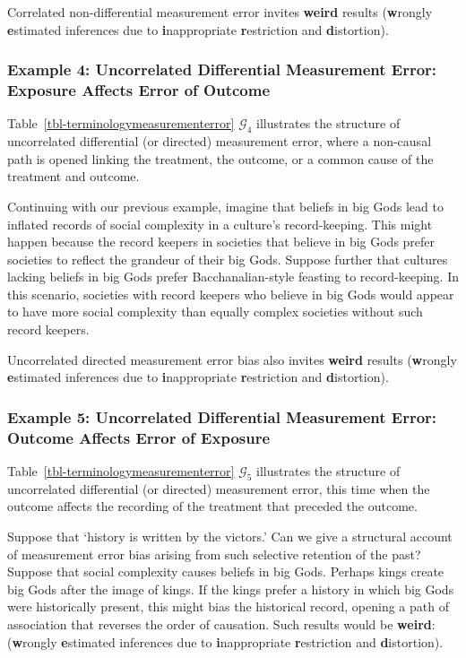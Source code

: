 \documentclass[
  single column]{article}
\begin{document}
Correlated non-differential measurement error invites \textbf{weird}
results (\textbf{w}rongly \textbf{e}stimated inferences due to
\textbf{i}nappropriate \textbf{r}estriction and \textbf{d}istortion).

\subsubsection{Example 4: Uncorrelated Differential Measurement Error:
Exposure Affects Error of
Outcome}\label{example-4-uncorrelated-differential-measurement-error-exposure-affects-error-of-outcome}

Table~\ref{tbl-terminologymeasurementerror} \(\mathcal{G}_4\)
illustrates the structure of uncorrelated differential (or directed)
measurement error, where a non-causal path is opened linking the
treatment, the outcome, or a common cause of the treatment and outcome.

Continuing with our previous example, imagine that beliefs in big Gods
lead to inflated records of social complexity in a culture's
record-keeping. This might happen because the record keepers in
societies that believe in big Gods prefer societies to reflect the
grandeur of their big Gods. Suppose further that cultures lacking
beliefs in big Gods prefer Bacchanalian-style feasting to
record-keeping. In this scenario, societies with record keepers who
believe in big Gods would appear to have more social complexity than
equally complex societies without such record keepers.

Uncorrelated directed measurement error bias also invites \textbf{weird}
results (\textbf{w}rongly \textbf{e}stimated inferences due to
\textbf{i}nappropriate \textbf{r}estriction and \textbf{d}istortion).

\subsubsection{Example 5: Uncorrelated Differential Measurement Error:
Outcome Affects Error of
Exposure}\label{example-5-uncorrelated-differential-measurement-error-outcome-affects-error-of-exposure}

Table~\ref{tbl-terminologymeasurementerror} \(\mathcal{G}_5\)
illustrates the structure of uncorrelated differential (or directed)
measurement error, this time when the outcome affects the recording of
the treatment that preceded the outcome.

Suppose that `history is written by the victors.' Can we give a
structural account of measurement error bias arising from such selective
retention of the past? Suppose that social complexity causes beliefs in
big Gods. Perhaps kings create big Gods after the image of kings. If the
kings prefer a history in which big Gods were historically present, this
might bias the historical record, opening a path of association that
reverses the order of causation. Such results would be \textbf{weird}:
(\textbf{w}rongly \textbf{e}stimated inferences due to
\textbf{i}nappropriate \textbf{r}estriction and \textbf{d}istortion).
\end{document}
